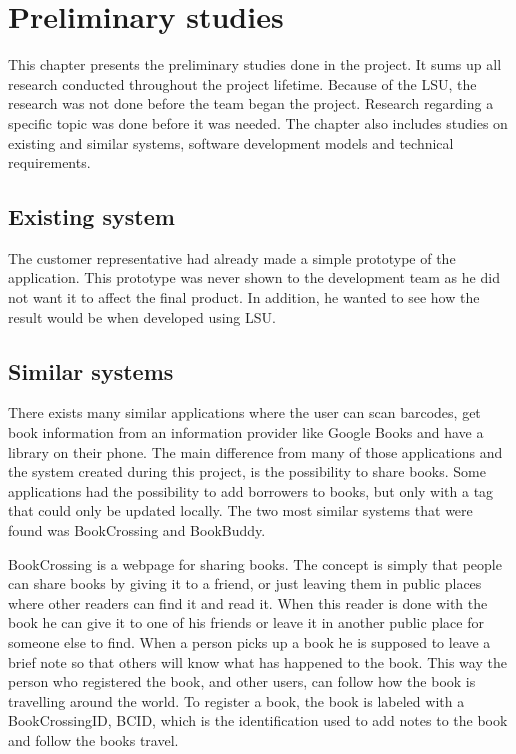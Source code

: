 \chapter{Preliminary studies} %
\label{chap:PreliminaryStudies}
This chapter presents the preliminary studies done in the project. It sums up all research conducted throughout the project lifetime. Because of the \gls{LSU}, the research was not done before the team began the project. Research regarding a specific topic was done before it was needed. The chapter also includes studies on existing and similar systems, software development models and technical requirements. 

\section{Existing system}
The customer representative had already made a simple prototype of the application. This prototype was never shown to the development team as he did not want it to affect the final product. In addition, he wanted to see how the result would be when developed using \gls{LSU}.  
\section{Similar systems}
There exists many similar applications where the user can scan barcodes, get book information from an information provider like Google Books and have a library on their phone. The main difference from many of those applications and the system created during this project, is the possibility to share books. Some applications had the possibility to add borrowers to books, but only with a tag that could only be updated locally. The two most similar systems that were found was BookCrossing and BookBuddy.

BookCrossing is a webpage for sharing books.\cite{book-crossing} The concept is simply that people can share books by giving it to a friend, or just leaving them in public places where other readers can find it and read it. When this reader is done with the book he can give it to one of his friends or leave it in another public place for someone else to find. When a person picks up a book he is supposed to leave a brief note so that others will know what has happened to the book. This way the person who registered the book, and other users, can follow how the book is travelling around the world. To register a book, the book is labeled with a BookCrossingID, BCID, which is the identification used to add notes to the book and follow the books travel.

